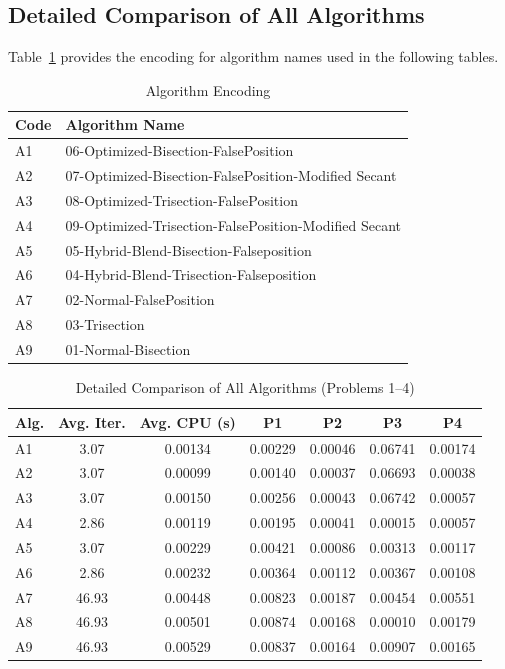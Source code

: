\documentclass[11pt,a4paper]{article}
\begin{document}
\subsection{Detailed Comparison of All Algorithms}

Table~\ref{tab:alg_encoding} provides the encoding for algorithm names used in the following tables.

\begin{table}[H]
\centering
\caption{Algorithm Encoding}
\label{tab:alg_encoding}
\begin{tabular}{ll}
\toprule
Code & Algorithm Name \\
\midrule
A1 & 06-Optimized-Bisection-FalsePosition \\
A2 & 07-Optimized-Bisection-FalsePosition-Modified Secant \\
A3 & 08-Optimized-Trisection-FalsePosition \\
A4 & 09-Optimized-Trisection-FalsePosition-Modified Secant \\
A5 & 05-Hybrid-Blend-Bisection-Falseposition \\
A6 & 04-Hybrid-Blend-Trisection-Falseposition \\
A7 & 02-Normal-FalsePosition \\
A8 & 03-Trisection \\
A9 & 01-Normal-Bisection \\
\bottomrule
\end{tabular}
\end{table}

\begin{table}[H]
\centering
\caption{Detailed Comparison of All Algorithms (Problems 1--4)}
\label{tab:detailed_comparison_1}
\begin{tabular}{lcccccc}
\toprule
Alg. & Avg. Iter. & Avg. CPU (s) & P1 & P2 & P3 & P4 \\
\midrule
A1 & 3.07 & 0.00134 & 0.00229 & 0.00046 & 0.06741 & 0.00174 \\
A2 & 3.07 & 0.00099 & 0.00140 & 0.00037 & 0.06693 & 0.00038 \\
A3 & 3.07 & 0.00150 & 0.00256 & 0.00043 & 0.06742 & 0.00057 \\
A4 & 2.86 & 0.00119 & 0.00195 & 0.00041 & 0.00015 & 0.00057 \\
A5 & 3.07 & 0.00229 & 0.00421 & 0.00086 & 0.00313 & 0.00117 \\
A6 & 2.86 & 0.00232 & 0.00364 & 0.00112 & 0.00367 & 0.00108 \\
A7 & 46.93 & 0.00448 & 0.00823 & 0.00187 & 0.00454 & 0.00551 \\
A8 & 46.93 & 0.00501 & 0.00874 & 0.00168 & 0.00010 & 0.00179 \\
A9 & 46.93 & 0.00529 & 0.00837 & 0.00164 & 0.00907 & 0.00165 \\
\bottomrule
\end{tabular}
\end{table}
\end{document}
